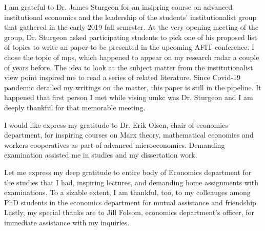 I am grateful to Dr. James Sturgeon for an insipring course on advanced institutional economics and the leadership of the students' institutionalist group that gathered in the early 2019 fall semester. At the very opening meeting of the group, Dr. Sturgeon asked participating students to pick one of his proposed list of topics to write an paper to be presented in the upcoming AFIT conference. I chose the topic of \ac{mps}, which happened to appear on my research radar a couple of years before. The idea to look at the subject matter from the institutionalist view point inspired me to read a series of related literature. Since Covid-19 pandemic derailed my writings on the matter, this paper is still in the pipeline. It happened that first person I met while vising \ac{umkc} was Dr. Sturgeon and I am deeply thankful for that memorable meeting.

I would like express my gratitude to Dr. Erik Olsen, chair of economics department, for inspiring courses on Marx theory, mathematical economics and workers cooperatives as part of advanced microeconomics. Demanding examination assisted me in studies and my dissertation work.

Let me express my deep gratitude to entire body of Economics department for the studies that I had, inspiring lectures, and demanding home assignments with examinations. To a sizable extent, I am thankful, too, to my colleauges among PhD students in the economics department for mutual assistance and friendship. Lastly, my special thanks are to Jill Folsom, economics department's officer, for immediate assistance with my inquiries. 

\newpage